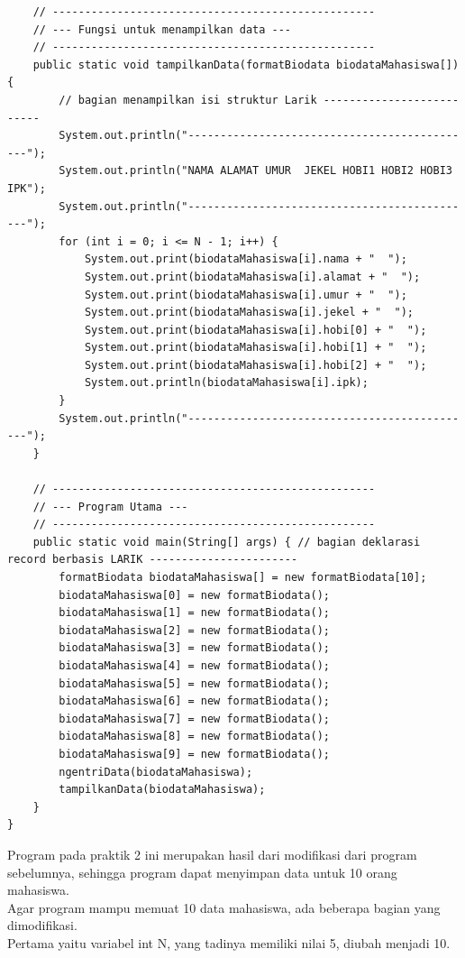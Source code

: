 \documentclass[a4paper,12pt]{article}
\begin{document}
\begin{lstlisting}
    // --------------------------------------------------
    // --- Fungsi untuk menampilkan data ---
    // --------------------------------------------------
    public static void tampilkanData(formatBiodata biodataMahasiswa[]) {
        // bagian menampilkan isi struktur Larik --------------------------
        System.out.println("---------------------------------------------");
        System.out.println("NAMA ALAMAT UMUR  JEKEL HOBI1 HOBI2 HOBI3 IPK");
        System.out.println("---------------------------------------------");
        for (int i = 0; i <= N - 1; i++) {
            System.out.print(biodataMahasiswa[i].nama + "  ");
            System.out.print(biodataMahasiswa[i].alamat + "  ");
            System.out.print(biodataMahasiswa[i].umur + "  ");
            System.out.print(biodataMahasiswa[i].jekel + "  ");
            System.out.print(biodataMahasiswa[i].hobi[0] + "  ");
            System.out.print(biodataMahasiswa[i].hobi[1] + "  ");
            System.out.print(biodataMahasiswa[i].hobi[2] + "  ");
            System.out.println(biodataMahasiswa[i].ipk);
        }
        System.out.println("---------------------------------------------");
    }

    // --------------------------------------------------
    // --- Program Utama ---
    // --------------------------------------------------
    public static void main(String[] args) { // bagian deklarasi record berbasis LARIK -----------------------
        formatBiodata biodataMahasiswa[] = new formatBiodata[10];
        biodataMahasiswa[0] = new formatBiodata();
        biodataMahasiswa[1] = new formatBiodata();
        biodataMahasiswa[2] = new formatBiodata();
        biodataMahasiswa[3] = new formatBiodata();
        biodataMahasiswa[4] = new formatBiodata();
        biodataMahasiswa[5] = new formatBiodata();
        biodataMahasiswa[6] = new formatBiodata();
        biodataMahasiswa[7] = new formatBiodata();
        biodataMahasiswa[8] = new formatBiodata();
        biodataMahasiswa[9] = new formatBiodata();
        ngentriData(biodataMahasiswa);
        tampilkanData(biodataMahasiswa);
    }
}
\end{lstlisting}
Program pada praktik 2 ini merupakan hasil dari modifikasi dari program sebelumnya, sehingga program dapat
menyimpan data untuk 10 orang mahasiswa.\\
Agar program mampu memuat 10 data mahasiswa, ada beberapa bagian yang dimodifikasi.\\
Pertama yaitu variabel int N, yang tadinya memiliki nilai 5, diubah menjadi 10.\\
\end{document}
